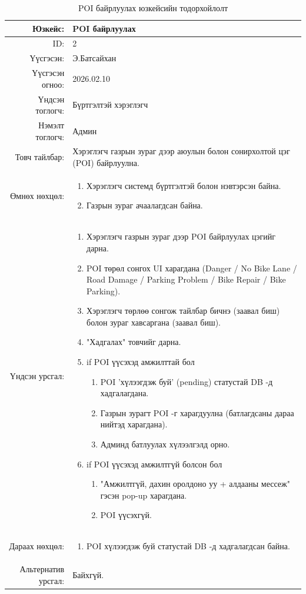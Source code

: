 \begin{longtable}{|r|p{11.5cm}|}
    \caption{POI байрлуулах юзкейсийн тодорхойлолт}
	\label{table:usecase2}\\ \hline
	{Юзкейс:} & {POI байрлуулах}\\ \hline
	{ID:} & {2}\\ \hline
	{Үүсгэсэн:} & {Э.Батсайхан}\\ \hline
	{Үүсгэсэн огноо:} & {2026.02.10}\\ \hline
	{Үндсэн тоглогч:} & {Бүртгэлтэй хэрэглэгч}\\ \hline
	{Нэмэлт тоглогч:} & {Админ}\\ \hline
	{Товч тайлбар:} & {Хэрэглэгч газрын зураг дээр аюулын болон сонирхолтой цэг (POI) байрлуулна.}\\ \hline
	{Өмнөх нөхцөл:} & {\begin{enumerate}[nosep]
	    \item Хэрэглэгч системд бүртгэлтэй болон нэвтэрсэн байна.
        \item Газрын зураг ачаалагдсан байна.
	\end{enumerate}}\\ \hline
	{Үндсэн урсгал:} & {
	\begin{enumerate}[nosep]
	    \item Хэрэглэгч газрын зураг дээр POI байрлуулах цэгийг дарна.
	    \item POI төрөл сонгох UI харагдана (Danger / No Bike Lane / Road Damage / Parking Problem / Bike Repair / Bike Parking).
	    \item Хэрэглэгч төрлөө сонгож тайлбар бичнэ (заавал биш) болон зураг хавсаргана (заавал биш).
        \item "Хадгалах" товчийг дарна.
	    \item if POI үүсэхэд амжилттай бол
	        \begin{enumerate}[nosep,label*=\arabic*.]
	            \item POI 'хүлээгдэж буй' (pending) статустай DB -д хадгалагдана.
                \item Газрын зурагт POI -г харагдуулна (батлагдсаны дараа нийтэд харагдана).
                \item Админд батлуулах хүлээлгэлд орно.
	        \end{enumerate}
	    \item if POI үүсэхэд амжилтгүй болсон бол
                \begin{enumerate}[nosep,label*=\arabic*.]
	        \item "Амжилтгүй, дахин оролдоно уу + алдааны мессеж" гэсэн pop-up харагдана.
                \item POI үүсэхгүй.
	    \end{enumerate}
	\end{enumerate}}\\ \hline
	{Дараах нөхцөл:} & {\begin{enumerate}
	    \item POI хүлээгдэж буй статустай DB -д хадгалагдсан байна.
	\end{enumerate}}\\ \hline
	{Альтернатив урсгал:} & {Байхгүй.}\\ \hline
\end{longtable}

